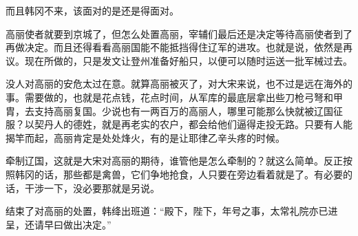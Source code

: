 而且韩冈不来，该面对的是还是得面对。

高丽使者就要到京城了，但怎么处置高丽，宰辅们最后还是决定等待高丽使者到了再做决定。而且还得看看高丽国能不能抵挡得住辽军的进攻。也就是说，依然是再议。现在所做的，只是发文让登州准备好船只，以便可以随时运送一批军械过去。

没人对高丽的安危太过在意。就算高丽被灭了，对大宋来说，也不过是远在海外的事。需要做的，也就是花点钱，花点时间，从军库的最底层拿出些刀枪弓弩和甲胄，去支持高丽复国。少说也有一两百万的高丽人，哪里可能那么快就被辽国征服？以契丹人的德姓，就是再老实的农户，都会给他们逼得走投无路。只要有人能揭竿而起，高丽肯定是处处烽火，有的是让耶律乙辛头疼的时候。

牵制辽国，这就是大宋对高丽的期待，谁管他是怎么牵制的？就这么简单。反正按照韩冈的话，那些都是禽兽，它们争地抢食，人只要在旁边看着就是了。有必要的话，干涉一下，没必要那就是另说。

结束了对高丽的处置，韩绛出班道：“殿下，陛下，年号之事，太常礼院亦已进呈，还请早曰做出决定。”

